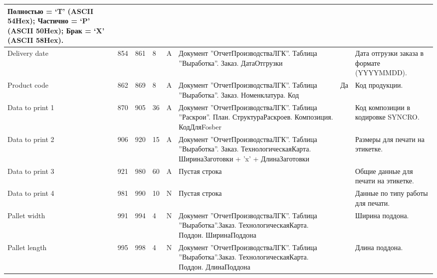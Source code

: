 \begin{landscape}
\begin{longtable}{|p{25mm}|p{6mm}|p{6mm}|p{8mm}|p{6mm}|p{60mm}|p{12mm}|p{100mm}|}
{Полностью = ‘T’ (ASCII 54Hex);
Частично = ‘P’ (ASCII 50Hex);
Брак = ‘X’ (ASCII 58Hex).} \\
\hline
\parbox[c][20mm]{25mm}{Delivery date} & \parbox{10mm}{854} & \parbox{10mm}{861} & \parbox{10mm}{8} & \parbox{10mm}{A} & \parbox{49mm}{Документ ''ОтчетПроизводстваЛГК''. Таблица ''Выработка''. Заказ. ДатаОтгрузки} & \parbox{11mm}{} & \parbox{89mm}{Дата отгрузки заказа в формате (YYYYMMDD).} \\
\hline
\parbox[c][20mm]{25mm}{Product code} & \parbox{10mm}{862} & \parbox{10mm}{869} & \parbox{10mm}{8} & \parbox{10mm}{A} & \parbox{49mm}{Документ ''ОтчетПроизводстваЛГК''. Таблица ''Выработка''. Заказ. Номенклатура. Код} & \parbox{11mm}{Да} & \parbox{89mm}{Код продукции.} \\
\hline
\parbox[c][20mm]{25mm}{Data to print 1} & \parbox{10mm}{870} & \parbox{10mm}{905} & \parbox{10mm}{36} & \parbox{10mm}{A} & \parbox{49mm}{Документ ''ОтчетПроизводстваЛГК''. Таблица ''Раскрои''. План. СтруктураРаскроев. Композиция. КодДляFosber} & \parbox{11mm}{} & \parbox{89mm}{Код композиции в кодировке SYNCRO.} \\
\hline
\parbox[c][22mm]{25mm}{Data to print 2} & \parbox{10mm}{906} & \parbox{10mm}{920} & \parbox{10mm}{15} & \parbox{10mm}{A} & \parbox{49mm}{Документ ''ОтчетПроизводстваЛГК''. Таблица ''Выработка''. Заказ. ТехнологическаяКарта. ШиринаЗаготовки + 'x' + ДлинаЗаготовки} & \parbox{11mm}{} & \parbox{89mm}{Размеры для печати на этикетке.} \\
\hline
\parbox[c][5mm]{25mm}{Data to print 3} & \parbox{10mm}{921} & \parbox{10mm}{980} & \parbox{10mm}{60} & \parbox{10mm}{A} & \parbox{49mm}{Пустая строка} & \parbox{11mm}{} & \parbox{89mm}{Общие данные для печати на этикетке.} \\
\hline
\parbox[c][9mm]{25mm}{Data to print 4} & \parbox{10mm}{981} & \parbox{10mm}{990} & \parbox{10mm}{10} & \parbox{10mm}{N} & \parbox{49mm}{Пустая строка} & \parbox{11mm}{} & \parbox{89mm}{Данные по типу работы для печати.} \\
\hline
\parbox[c][22mm]{25mm}{Pallet width} & \parbox{10mm}{991} & \parbox{10mm}{994} & \parbox{10mm}{4} & \parbox{10mm}{N} & \parbox{49mm}{Документ ''ОтчетПроизводстваЛГК''. Таблица ''Выработка''.Заказ. ТехнологическаяКарта. Поддон. ШиринаПоддона} & \parbox{11mm}{} & \parbox{89mm}{Ширина поддона.} \\
\hline
\parbox[c][20mm]{25mm}{Pallet length} & \parbox{10mm}{995} & \parbox{10mm}{998} & \parbox{10mm}{4} & \parbox{10mm}{N} & \parbox{49mm}{Документ ''ОтчетПроизводстваЛГК''. Таблица ''Выработка''.Заказ. ТехнологическаяКарта. Поддон. ДлинаПоддона} & \parbox{11mm}{} & \parbox{89mm}{Длина поддона.} \\

\end{longtable}
\end{landscape}
